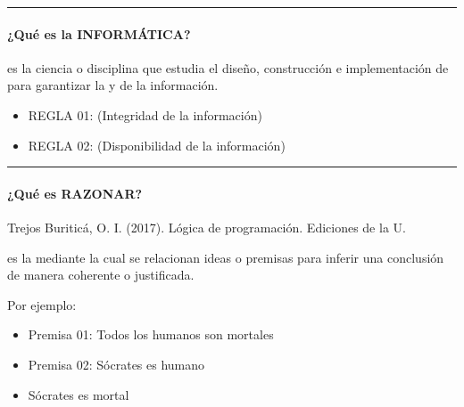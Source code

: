 \documentclass[letterpaper,10pt,spanish]{sphinxmanual}
\begin{document}
\bigskip\hrule\bigskip



\paragraph{¿Qué es la INFORMÁTICA?}
\label{\detokenize{cursos/logica8/recursos/T01:que-es-la-informatica}}
\sphinxAtStartPar
\sphinxfootnotemark[2]  es la ciencia o disciplina que estudia el diseño, construcción e implementación de  para garantizar la  y  de la información.
\begin{itemize}
\item {} 
\sphinxAtStartPar
REGLA 01: (Integridad de la información)
\begin{quote}

\sphinxAtStartPar
{}
\end{quote}

\item {} 
\sphinxAtStartPar
REGLA 02: (Disponibilidad de la información)
\begin{quote}

\sphinxAtStartPar
{}
\end{quote}

\end{itemize}


\bigskip\hrule\bigskip



\paragraph{¿Qué es RAZONAR?}
\label{\detokenize{cursos/logica8/recursos/T01:que-es-razonar}}
\sphinxAtStartPar
%
\begin{footnote}[3]\sphinxAtStartFootnote
Trejos Buriticá, O. I. (2017). Lógica de programación. Ediciones de la U.
%
\end{footnote}  es la  mediante la cual se relacionan ideas o premisas para inferir una conclusión de manera coherente o justificada.

\sphinxAtStartPar
Por ejemplo:
\begin{itemize}
\item {} 
\sphinxAtStartPar
Premisa 01: Todos los humanos son mortales

\item {} 
\sphinxAtStartPar
Premisa 02: Sócrates es humano

\item {} 
\sphinxAtStartPar
{} Sócrates es mortal

\end{itemize}
\end{document}
